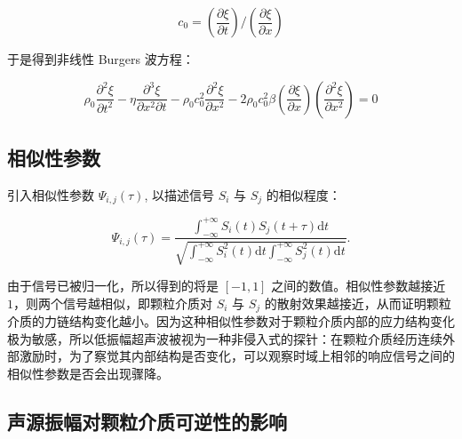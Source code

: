 \begin{equation}
  c_{0} = \left(\frac{\partial \xi}{\partial t}\right)/\left(\frac{\partial\xi}{\partial x}\right)
\end{equation}

于是得到非线性 Burgers 波方程：


\begin{equation}
  \rho_{0}\frac{\partial^{2}\xi}{\partial t^{2}} - \eta\frac{\partial^{3}\xi}{\partial x^{2}\partial t} - \rho_{0}c_{0}^{2}\frac{\partial^{2}\xi}{\partial x^{2}} - 2\rho_{0}c_{0}^{2}\beta\left(\frac{\partial \xi}{\partial x}\right)\left(\frac{\partial^{2} \xi}{\partial x^{2}}\right) = 0
\end{equation}



\subsection{相似性参数}

引入相似性参数 $\Psi_{i,j}(\tau)$, 以描述信号 $S_{i}$ 与 $S_{j}$ 的相似程度\cite{PhysRevLett.90.174302}：

\begin{equation}
  \Psi_{i,j}(\tau) = \frac{\int_{-\infty}^{+\infty}S_{i}(t)S_{j}(t+\tau)\mathrm{d}t}{\sqrt{\int_{-\infty}^{+\infty}S_{i}^{2}(t)\mathrm{d}t\int_{-\infty}^{+\infty}S_{j}^{2}(t)\mathrm{d}t}}.
\end{equation}

由于信号已被归一化，所以得到的将是 $[-1,1]$ 之间的数值。相似性参数越接近 $1$，则两个信号越相似，即颗粒介质对 $S_{i}$ 与 $S_{j}$ 的散射效果越接近，从而证明颗粒介质的力链结构变化越小。因为这种相似性参数对于颗粒介质内部的应力结构变化极为敏感，所以低振幅超声波被视为一种非侵入式的探针：在颗粒介质经历连续外部激励时，为了察觉其内部结构是否变化，可以观察时域上相邻的响应信号之间的相似性参数是否会出现骤降。

\subsection{声源振幅对颗粒介质可逆性的影响}